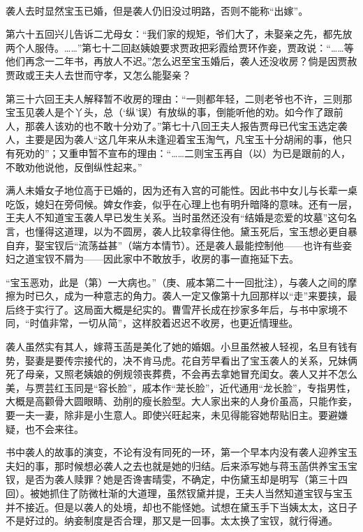 \par 袭人去时显然宝玉已婚，但是袭人仍旧没过明路，否则不能称“出嫁”。
\par 第六十五回兴儿告诉二尤母女：“我们家的规矩，爷们大了，未娶亲之先，都先放两个人服侍。……”第七十二回赵姨娘要求贾政把彩霞给贾环作妾，贾政说：“……等他们再念一二年书，再放人不迟。”怎么迟至宝玉婚后，袭人还没收房？倘是因贾赦贾政或王夫人去世而守孝，又怎么能娶亲？
\par 第三十六回王夫人解释暂不收房的理由：“一则都年轻，二则老爷也不许，三则那宝玉见袭人是个丫头，总（‘纵’误）有放纵的事，倒能听他的劝。如今作了跟前人，那袭人该劝的也不敢十分劝了。”第七十八回王夫人报告贾母已代宝玉选定袭人，主要是因为袭人“这几年来从未逢迎着宝玉淘气，凡宝玉十分胡闹的事，他只有死劝的”；又重申暂不宣布的理由：“……二则宝玉再自（以）为已是跟前的人，不敢劝他说他，反倒纵性起来。”
\par 满人未婚女子地位高于已婚的，因为还有入宫的可能性。因此书中女儿与长辈一桌吃饭，媳妇在旁伺候。婢女作妾，似乎在心理上也有明升暗降的意味。还有一层，王夫人不知道宝玉袭人早已发生关系。当时虽然还没有“结婚是恋爱的坟墓”这句名言，也懂得这道理，以为不圆房，袭人比较拿得住他。黛玉死后，宝玉想必更自暴自弃，娶宝钗后“流荡益甚”（端方本情节）。还是袭人最能控制他——也许有些妾妇之道宝钗不屑为——因此家中不敢放手，收房的事一直拖延下去。
\par “宝玉恶劝，此是（第）一大病也。”（庚、戚本第二十一回批注），与袭人之间的摩擦为时已久，成为一种意志的角力。袭人一定又像第十九回那样以“走”来要挟，最后终于实行了。这局面大概是纪实的。曹雪芹长成在抄家多年后，与书中家境不同，“时值非常，一切从简”，这样胶着迟迟不收房，也更近情理些。
\par 袭人虽然实有其人，嫁蒋玉菡是美化了她的婚姻。小旦虽然被人轻视，名旦有钱有势，娶妻是要传宗接代的，决不肯马虎。花自芳早看出了宝玉袭人的关系，兄妹俩死了母亲，又照老姨娘的例规领丧葬费，不会再去拿她冒充闺女。袭人又并不怎么美，与贾芸红玉同是“容长脸”，戚本作“茏长脸”，近代通用“龙长脸”，专指男性，大概是高颧骨大圆眼睛、劲削的瘦长脸型。大人家出来的人身价虽高，只能作妾，要一夫一妻，除非是小生意人。即使兴旺起来，未见得能容她帮贴旧主。要避嫌疑，也不会来往。
\par 书中袭人的故事的演变，不论有没有同死的一环，第一个早本内没有袭人迎养宝玉夫妇的事，那时候想必袭人之去也就是她的归结。后来添写她与蒋玉菡供养宝玉宝钗，是否为袭人赎罪？她是否谗害晴雯，不确定，中伤黛玉却是明写（第三十四回）。被她抓住了防微杜渐的大道理，虽然钗黛并提，王夫人当然知道宝钗与宝玉并不接近。但是以袭人的处境，却也不能怪她。试想在黛玉手下当姨太太，这日子不是好过的。纳妾制度是否合理，那又是一回事。太太换了宝钗，就行得通。
